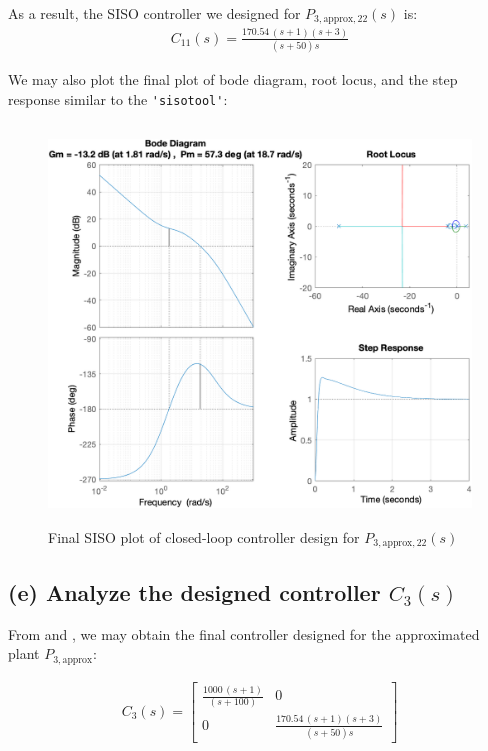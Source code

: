 \documentclass{tron}
\newcommand{\apx}{\text{approx}}
\begin{document}
As a result, the SISO controller we designed for $P_{3, \apx, 22}(s)$ is: 
\begin{align}
	C_{11}(s) = \frac{170.54 \, (s+1) (s+3)}{(s+50) s}	
	\label{eqn:p5:c22}
\end{align}

We may also plot the final plot of bode diagram, root locus, and the step response similar to the \verb|'sisotool'|:
\begin{figure}[H]
	\centering
	\includegraphics[height=400px]{../matlab/output/p5/siso_plot_Ideal(2,2)}
	\caption{Final SISO plot of closed-loop controller design for $P_{3, \apx, 22}(s)$}
	\label{fig:p5:P3_aug22:siso-final}
\end{figure}

\clearpage
\subsection{(e) Analyze the designed controller $C_{3}(s)$ \label{ans:P5-e}}
From  and , we may obtain the final controller designed for the approximated plant $P_{3, \apx}$:

\begin{align}
	C_{3}(s) = 
	\begin{bmatrix}
		\frac{1000 \, (s + 1)}{(s + 100)} & 0 \\
		0 &  \frac{170.54 \, (s+1) (s+3)}{(s+50) s}	
	\end{bmatrix}
	\label{eqn:p5:c3}
\end{align}
\end{document}
